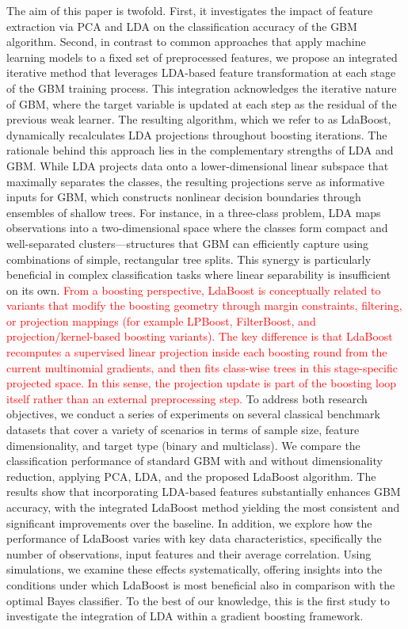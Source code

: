 \documentclass[11pt,a4paper]{article}
\providecommand{\DIFaddtex}[1]{\textcolor{red}{#1}} %
\providecommand{\DIFaddbegin}{} %
\providecommand{\DIFaddend}{} %
\providecommand{\DIFadd}[1]{\texorpdfstring{\DIFaddtex{#1}}{#1}} %
\begin{document}
The aim of this paper is twofold. First, it investigates the impact of feature extraction via PCA and LDA on the classification accuracy of the GBM algorithm. Second, in contrast to common approaches that apply machine learning models to a fixed set of preprocessed features, we propose an integrated iterative method that leverages LDA-based feature transformation at each stage of the GBM training process. This integration acknowledges the iterative nature of GBM, where the target variable is updated at each step as the residual of the previous weak learner. The resulting algorithm, which we refer to as LdaBoost, dynamically recalculates LDA projections throughout boosting iterations.
The rationale behind this approach lies in the complementary strengths of LDA and GBM. While LDA projects data onto a lower-dimensional linear subspace that maximally separates the classes, the resulting projections serve as informative inputs for GBM, which constructs nonlinear decision boundaries through ensembles of shallow trees. For instance, in a three-class problem, LDA maps observations into a two-dimensional space where the classes form compact and well-separated clusters---structures that GBM can efficiently capture using combinations of simple, rectangular tree splits. This synergy is particularly beneficial in complex classification tasks where linear separability is insufficient on its own.
\DIFaddbegin \DIFadd{From a boosting perspective, LdaBoost is conceptually related to variants that modify the boosting geometry through margin constraints, filtering, or projection mappings (for example LPBoost, FilterBoost, and projection/kernel-based boosting variants). The key difference is that LdaBoost recomputes a supervised linear projection inside each boosting round from the current multinomial gradients, and then fits class-wise trees in this stage-specific projected space. In this sense, the projection update is part of the boosting loop itself rather than an external preprocessing step.
}\DIFaddend To address both research objectives, we conduct a series of experiments on several classical benchmark datasets that cover a variety of scenarios in terms of sample size, feature dimensionality, and target type (binary and multiclass). We compare the classification performance of standard GBM with and without dimensionality reduction, applying PCA, LDA, and the proposed LdaBoost algorithm. The results show that incorporating LDA-based features substantially enhances GBM accuracy, with the integrated LdaBoost method yielding the most consistent and significant improvements over the baseline.
In addition, we explore how the performance of LdaBoost varies with key data characteristics, specifically the number of observations, input features and their average correlation. Using simulations, we examine these effects systematically, offering insights into the conditions under which LdaBoost is most beneficial also in comparison with the optimal Bayes classifier. To the best of our knowledge, this is the first study to investigate the integration of LDA within a gradient boosting framework.
\end{document}
